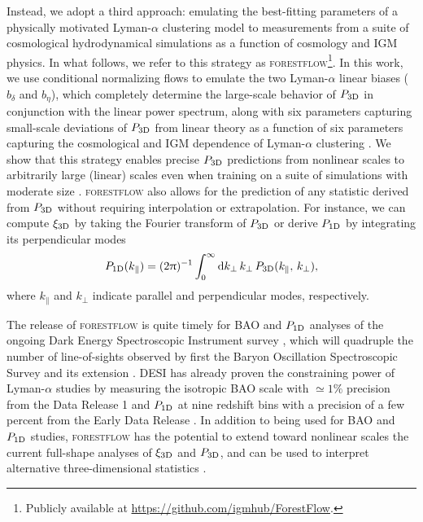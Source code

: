 \documentclass[longauth]{aa}
\newcommand{\lya}{Lyman-$\alpha$\xspace}
\newcommand{\poned}{\ensuremath{P_{\rm 1D}}\xspace}
\newcommand{\xithreed}{\ensuremath{\xi_{\rm 3D}}\xspace}
\newcommand{\pthreed}{\ensuremath{P_{\rm 3D}}\xspace}
\newcommand{\forestflow}{\textsc{forestflow}\xspace}
\begin{document}
Instead, we adopt a third approach: emulating the best-fitting parameters of a physically motivated \lya clustering model to measurements from a suite of cosmological hydrodynamical simulations as a function of cosmology and IGM physics. In what follows, we refer to this strategy as \forestflow\footnote{Publicly available at \url{https://github.com/igmhub/ForestFlow}.}. In this work, we use conditional normalizing flows \citep[cNF;][]{Winkler2019, cNF_Papamakarios} to emulate the two \lya linear biases ($b_\delta$ and $b_\eta$), which completely determine the large-scale behavior of \pthreed in conjunction with the linear power spectrum, along with six parameters capturing small-scale deviations of \pthreed from linear theory as a function of six parameters capturing the cosmological and IGM dependence of \lya clustering \citep{Pedersen2021}. We show that this strategy enables precise \pthreed predictions from nonlinear scales to arbitrarily large (linear) scales even when training on a suite of simulations with moderate size \citep{Pedersen2021, cabayol-garcia2023NeuralNetworkEmulator}. \forestflow also allows for the prediction of any statistic derived from \pthreed without requiring interpolation or extrapolation. For instance, we can compute \xithreed by taking the Fourier transform of \pthreed or derive \poned by integrating its perpendicular modes
%
\begin{equation}
    \label{eq:p1d}
    \poned(k_\parallel)=(2\uppi)^{-1}\int_0^\infty \mathrm{d} k_\perp\, k_\perp\, \pthreed(k_\parallel,\, k_\perp),
\end{equation}
%
where $k_\parallel$ and $k_\perp$ indicate parallel and perpendicular modes, respectively.

The release of \forestflow is quite timely for BAO and \poned analyses of the ongoing Dark Energy Spectroscopic Instrument survey \citep[DESI;][]{DESI_collab2016}, which will quadruple the number of line-of-sights observed by first the Baryon Oscillation Spectroscopic Survey \citep[BOSS;][]{boss_dawson2013} and its extension \citep[eBOSS;][]{eboss_dawson2016}. DESI has already proven the constraining power of \lya studies by measuring the isotropic BAO scale with $\simeq1\%$ precision from the Data Release 1 \citep{desicollaboration2024DESI2024IV} and \poned at nine redshift bins with a precision of a few percent from the Early Data Release \citep{ravoux2023DarkEnergySpectroscopica, karacayli2024Optimal1DLy}. In addition to being used for BAO and \poned studies, \forestflow has the potential to extend toward nonlinear scales the current full-shape analyses of \xithreed \citep{cuceu2023ConstraintsCosmicExpansion, 2023MNRAS.518.2567G} and \pthreed \citep{fontribera2018HowEstimate3D, Belsunce2024eBOSS, Horowitz2024}, and can be used to interpret alternative three-dimensional statistics \citep{hui1999GeometricalTestCosmological, fontribera2018HowEstimate3D, Karim2023}.
\end{document}
